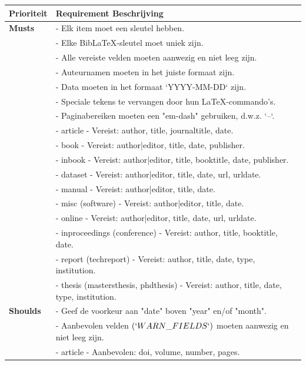 \begin{table}[ht]
    \centering
    \begin{tabular}{p{2.5cm} p{13cm}}
        \toprule
        \textbf{Prioriteit} & \textbf{Requirement Beschrijving} \\
        \midrule
        \textbf{Musts} & 
          - Elk item moet een sleutel hebben. \\
        & - Elke BibLaTeX-sleutel moet uniek zijn. \\
        & - Alle vereiste velden moeten aanwezig en niet leeg zijn. \\
        & - Auteurnamen moeten in het juiste formaat zijn. \\
        & - Data moeten in het formaat `YYYY-MM-DD` zijn. \\
        & - Speciale tekens te vervangen door hun LaTeX-commando's. \\
        & - Paginabereiken moeten een "em-dash" gebruiken, d.w.z. `--`. \\
        & - article - Vereist: author, title, journaltitle, date. \\
        & - book - Vereist: author|editor, title, date, publisher. \\
        & - inbook - Vereist: author|editor, title, booktitle, date, publisher. \\
        & - dataset - Vereist: author|editor, title, date, url, urldate. \\
        & - manual - Vereist: author|editor, title, date. \\
        & - misc (software) - Vereist: author|editor, title, date. \\
        & - online - Vereist: author|editor, title, date, url, urldate. \\
        & - inproceedings (conference) - Vereist: author, title, booktitle, date. \\
        & - report (techreport) - Vereist: author, title, date, type, institution. \\
        & - thesis (mastersthesis, phdthesis) - Vereist: author, title, date, type, institution. \\
        \midrule
        \textbf{Shoulds} 
        & - Geef de voorkeur aan "date" boven "year" en/of "month". \\
        & - Aanbevolen velden \texttt{$(`WARN\_FIELDS`)$} moeten aanwezig en niet leeg zijn. \\
        & - article - Aanbevolen: doi, volume, number, pages. \\

\end{tabular}
\end{table}
